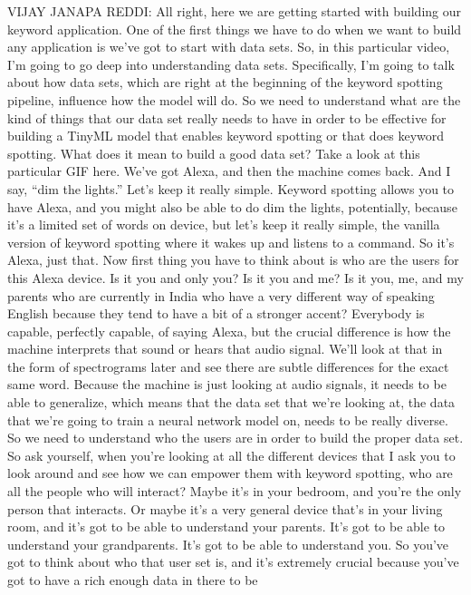 VIJAY JANAPA REDDI: All right, here we are
getting started with building our keyword application.
One of the first things we have to do when we want to build any application
is we've got to start with data sets.
So, in this particular video, I'm going to go deep into understanding data
sets.
Specifically, I'm going to talk about how
data sets, which are right at the beginning of the keyword
spotting pipeline, influence how the model will do.
So we need to understand what are the kind of things that our data set really
needs to have in order to be effective for building a TinyML model that
enables keyword spotting or that does keyword spotting.
What does it mean to build a good data set?
Take a look at this particular GIF here.
We've got Alexa, and then the machine comes back.
And I say, ``dim the lights.''
Let's keep it really simple.
Keyword spotting allows you to have Alexa,
and you might also be able to do dim the lights, potentially,
because it's a limited set of words on device,
but let's keep it really simple, the vanilla version of keyword spotting
where it wakes up and listens to a command.
So it's Alexa, just that.
Now first thing you have to think about is who
are the users for this Alexa device.
Is it you and only you?
Is it you and me?
Is it you, me, and my parents who are currently
in India who have a very different way of speaking English
because they tend to have a bit of a stronger accent?
Everybody is capable, perfectly capable, of saying Alexa,
but the crucial difference is how the machine interprets that sound
or hears that audio signal.
We'll look at that in the form of spectrograms
later and see there are subtle differences for the exact same word.
Because the machine is just looking at audio signals,
it needs to be able to generalize, which means that the data set that we're
looking at, the data that we're going to train a neural network model on,
needs to be really diverse.
So we need to understand who the users are in order
to build the proper data set.
So ask yourself, when you're looking at all the different devices
that I ask you to look around and see how
we can empower them with keyword spotting, who
are all the people who will interact?
Maybe it's in your bedroom, and you're the only person that interacts.
Or maybe it's a very general device that's in your living room,
and it's got to be able to understand your parents.
It's got to be able to understand your grandparents.
It's got to be able to understand you.
So you've got to think about who that user set is, and it's
extremely crucial because you've got to have a rich enough data in there to be
